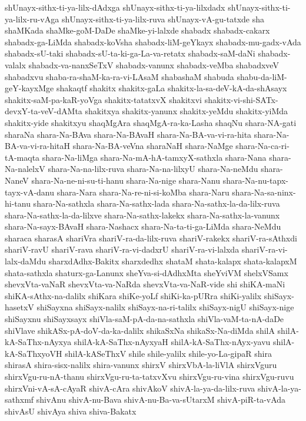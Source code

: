 {shUnayx-sithx-ti-ya-lilx-dAdxga
shUnayx-sithx-ti-ya-lilxdadx
shUnayx-sithx-ti-ya-lilx-ru-vAga
shUnayx-sithx-ti-ya-lilx-ruva
shUnayx-vA-gu-tatxde
sha
shaMKada
shaMke-goM-DaDe
shaMke-yi-lalxde
shabadx
shabadx-cakarx
shabadx-ga-LiMda
shabadx-koVsha
shabadx-liM-geYkayx
shabadx-mu-gadx-vAda
shabadx-sU-taki
shabadx-sU-ta-ki-ga-La-va-retatx
shabadx-saM-daNi
shabadx-valalx
shabadx-va-nanxSeTxV
shabadx-vanunx
shabadx-veMba
shabadxveV
shabadxvu
shaba-ra-shaM-ka-ra-vi-LAsaM
shabashaM
shabuda
shabu-da-liM-geY-kayxMge
shakaqtf
shakitx
shakitx-gaLa
shakitx-la-sa-deV-kA-da-shAsayx
shakitx-saM-pa-kaR-yoVga
shakitx-tatatxvX
shakitxvi
shakitx-vi-shi-SATx-devxY-ta-veV-dAMta
shakitxya
shakitx-yanunx
shakitx-yeMdu
shakitx-yiMda
shakitx-yide
shakitxyu
shaqMgAra
shaqMgA-ra-ka-Lasha
shaqNu
shara-NA-gati
sharaNa
shara-Na-BAva
shara-Na-BAvaH
shara-Na-BA-va-vi-ra-hita
shara-Na-BA-va-vi-ra-hitaH
shara-Na-BA-veVna
sharaNaH
shara-NaMge
shara-Na-ca-ri-tA-maqta
shara-Na-liMga
shara-Na-mA-hA-tamxyX-sathxla
shara-Nana
shara-Na-nalelxV
shara-Na-na-lilx-ruva
shara-Na-na-lilxyU
shara-Na-neMdu
shara-NaneV
shara-Na-ne-ni-su-ti-hanu
shara-Na-nige
shara-Nanu
shara-Na-nu-tapx-tayx-vA-danu
shara-Nara
shara-Na-re-ni-si-koMba
shara-Naru
shara-Na-sa-ninx-hi-tanu
shara-Na-sathxla
shara-Na-sathx-lada
shara-Na-sathx-la-da-lilx-ruva
shara-Na-sathx-la-da-lilxve
shara-Na-sathx-lakekx
shara-Na-sathx-la-vanunx
shara-Na-sayx-BAvaH
shara-Nashacx
shara-Na-ta-ti-ga-LiMda
shara-NeMdu
sharaca
sharasA
shariVra
shariV-ra-da-lilx-ruva
shariV-rakekx
shariV-ra-sAthxdi
shariV-ravU
shariV-rava
shariV-ra-vi-dadxrU
shariV-ra-vi-lalxda
shariV-ra-vi-lalx-daMdu
sharxdAdhx-Bakitx
sharxdedhx
shataM
shata-kalapx
shata-kalapxM
shata-sathxla
shaturx-ga-Lanunx
sheYva-si-dAdhxMta
sheYviVM
shelxVSamx
shevxVta-vaNaR
shevxVta-va-NaRda
shevxVta-va-NaR-vide
shi
shiKA-maNi
shiKA-sAthx-na-dalilx
shiKara
shiKe-yoLf
shiKi-ka-pURra
shiKi-yalilx
shiSayx-hasetxV
shiSayxna
shiSayx-nalilx
shiSayx-na-ri-talilx
shiSayx-nigU
shiSayx-nige
shiSayxnu
shiSayxsayx
shiVla-saM-pA-da-na-sathxla
shiVla-vaM-ta-nA-daDe
shiVlave
shikASx-pA-doV-da-ka-dalilx
shikaSxNa
shikaSx-Na-diMda
shilA
shilA-kA-SaThx-nAyxya
shilA-kA-SaThx-nAyxyaH
shilA-kA-SaThx-nAyx-yavu
shilA-kA-SaThxyoVH
shilA-kASeThxV
shile
shile-yalilx
shile-yo-La-gipaR
shira
shirasA
shira-sisx-nalilx
shira-vanunx
shirxV
shirxVbA-la-liVlA
shirxVguru
shirxVgu-ru-nA-thanu
shirxVgu-ru-ta-tatxvXvu
shirxVgu-ru-vina
shirxVgu-ruvu
shirxVni-vA-sA-cAyaR
shivA-cAra
shivAkoV
shivA-la-ya-da-lilx-ruva
shivA-la-ya-sathxmf
shivAnu
shivA-nu-Bava
shivA-nu-Ba-va-sUtarxM
shivA-piR-ta-vAda
shivAsU
shivAya
shiva
shiva-Bakatx
}
